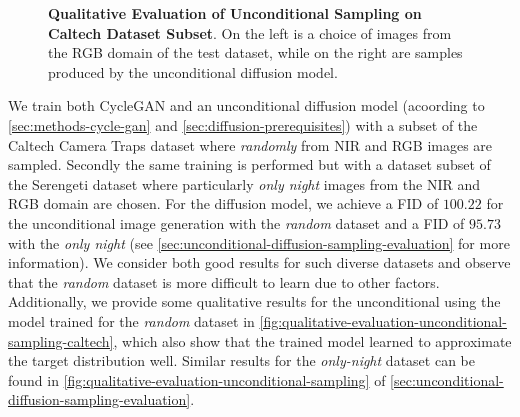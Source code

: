 \begin{figure}[htp!]
\begin{tabularx}{.8\textwidth}{Y Y Y !{\hspace{.05\textwidth}} Y Y Y}
    \end{tabularx}
    \caption{
        \textbf{Qualitative Evaluation of Unconditional Sampling on Caltech Dataset Subset}.
        On the left is a choice of images from the RGB domain of the test dataset, while on the right are samples produced by the unconditional diffusion model.
    }
    \label{fig:qualitative-evaluation-unconditional-sampling-caltech}
\end{figure}

We train both CycleGAN and an unconditional diffusion model (acoording to \autoref{sec:methods-cycle-gan} and \autoref{sec:diffusion-prerequisites}) with a subset of the Caltech Camera Traps dataset \parencite{caltech} where \textit{randomly} from NIR and RGB images are sampled.
Secondly the same training is performed but with a dataset subset of the Serengeti dataset \parencite{serengeti} where particularly \textit{only night} images from the NIR and RGB domain are chosen.
For the diffusion model,
we achieve a FID of $100.22$ for the unconditional image generation with the \textit{random} dataset and a FID of $95.73$ with the \textit{only night} (see \autoref{sec:unconditional-diffusion-sampling-evaluation} for more information).
We consider both good results for such diverse datasets and observe that the \textit{random} dataset is more difficult to learn due to other factors.
Additionally, we provide some qualitative results for the unconditional using the model trained for the \textit{random} dataset in \autoref{fig:qualitative-evaluation-unconditional-sampling-caltech},
which also show that the trained model learned to approximate the target distribution well.
Similar results for the \textit{only-night} dataset can be found in \autoref{fig:qualitative-evaluation-unconditional-sampling} of \autoref{sec:unconditional-diffusion-sampling-evaluation}.


